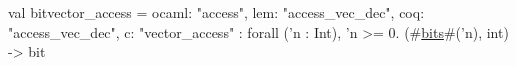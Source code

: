 val bitvector_access = {
  ocaml: "access",
  lem: "access_vec_dec",
  coq: "access_vec_dec",
  c: "vector_access"
} : forall ('n : Int), 'n >= 0. (#\hyperref[zbits]{bits}#('n), int) -> bit
